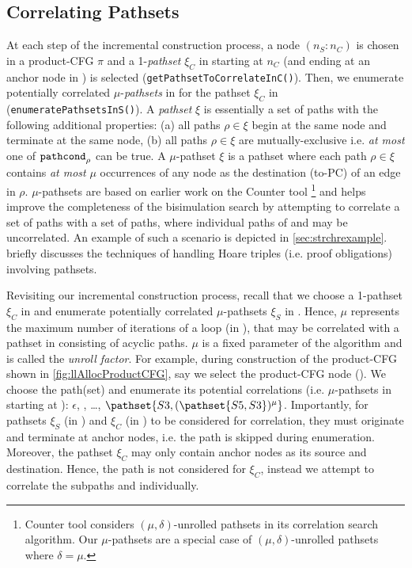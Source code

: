 \subsection{Correlating Pathsets}
\label{sec:pathsetcorrel}
At each step of the incremental construction process, a node $(n_S\!:\!n_C)$ is chosen in a product-CFG $\pi$
and a 1-{\em pathset} $\xi_C$ in \cprog{} starting at $n_C$ (and ending at an anchor node in \cprog{}) is selected ({\tt getPathsetToCorrelateInC()}).
Then, we enumerate potentially correlated $\mu$-{\em pathsets} in \sprog{} for the pathset $\xi_C$ in \cprog{} ({\tt enumeratePathsetsInS()}).
A {\em pathset} $\xi$ is essentially a set of paths with the following additional properties:
(a) all paths $\rho \in \xi$ begin at the same node and terminate at the same node,
(b) all paths $\rho \in \xi$ are mutually-exclusive i.e. {\em at most} one of ${\tt pathcond}_\rho$ can be true.
A $\mu$-pathset $\xi$ is a pathset where each path $\rho \in \xi$ contains {\em at most} $\mu$ occurrences of any node
as the destination (to-PC) of an edge in $\rho$.
$\mu$-pathsets are based on earlier work on the Counter tool \cite{oopsla20}\footnote{
Counter tool \cite{oopsla20} considers $(\mu,\delta)$-unrolled pathsets in its correlation search algorithm.
Our $\mu$-pathsets are a special case of $(\mu,\delta)$-unrolled pathsets where $\delta = \mu$.}
and helps improve the completeness of the bisimulation search
by attempting to correlate a set of \cprog{} paths with a set of \sprog{} paths,
where individual paths of \cprog{} and \sprog{} may be uncorrelated.
An example of such a scenario is depicted in \cref{sec:strchrexample}.
 briefly discusses the techniques of handling Hoare triples (i.e. proof obligations)
involving pathsets.

Revisiting our incremental construction process, recall that we choose a 1-pathset $\xi_C$ in \cprog{}
and enumerate potentially correlated $\mu$-pathsets $\xi_S$ in \sprog{}.
Hence, $\mu$ represents the maximum number of iterations of a loop (in \sprog{}),
that may be correlated with a pathset in \cprog{} consisting of acyclic paths.
$\mu$ is a fixed parameter of the \toolName{} algorithm and is called the {\em unroll factor}.
For example, during construction of the product-CFG shown in \cref{fig:llAllocProductCFG},
say we select the product-CFG node ().
We choose the \cprog{} path(set)  and enumerate its potential correlations (i.e. $\mu$-pathsets in \sprog{} starting at ):
$\epsilon$, , \ldots, $\pathset{S3,(\pathset{S5,S3})^{\mu}}$.
Importantly, for pathsets $\xi_S$ (in \sprog{}) and $\xi_C$ (in \cprog{}) to be considered for correlation,
they must originate and terminate at anchor nodes, i.e. the path  is skipped during enumeration.
Moreover, the pathset $\xi_C$ may only contain anchor nodes as its source and destination.
Hence, the path  is not considered for $\xi_C$,
instead we attempt to correlate the subpaths  and  individually.

